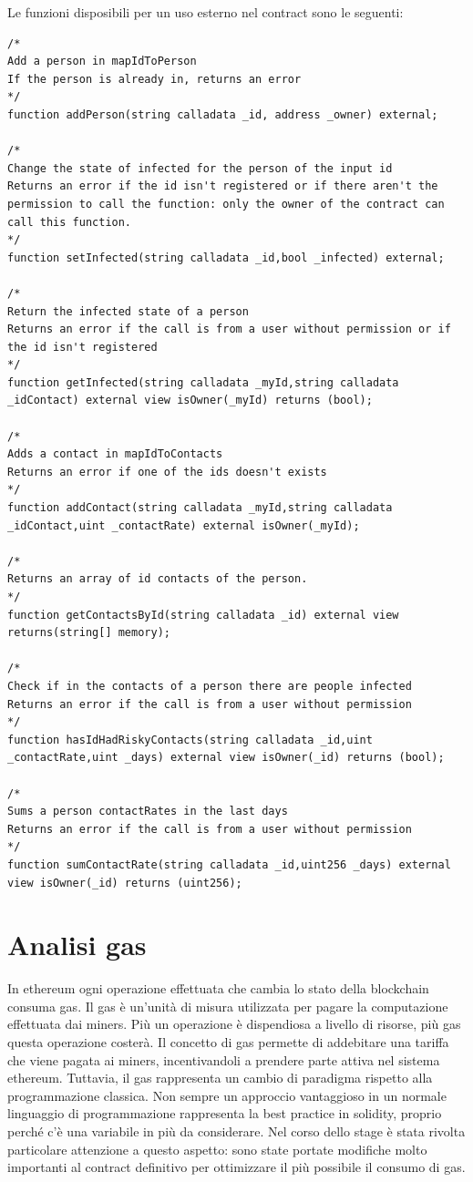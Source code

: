 Le funzioni disposibili per un uso esterno nel contract sono le seguenti:
\begin{lstlisting}[language=Solidity]
/*
Add a person in mapIdToPerson
If the person is already in, returns an error
*/
function addPerson(string calladata _id, address _owner) external;

/*
Change the state of infected for the person of the input id
Returns an error if the id isn't registered or if there aren't the permission to call the function: only the owner of the contract can call this function.
*/    
function setInfected(string calladata _id,bool _infected) external;

/*
Return the infected state of a person
Returns an error if the call is from a user without permission or if the id isn't registered
*/
function getInfected(string calladata _myId,string calladata _idContact) external view isOwner(_myId) returns (bool);

/*
Adds a contact in mapIdToContacts
Returns an error if one of the ids doesn't exists
*/    
function addContact(string calladata _myId,string calladata _idContact,uint _contactRate) external isOwner(_myId);

/*
Returns an array of id contacts of the person.
*/    
function getContactsById(string calladata _id) external view returns(string[] memory);

/*
Check if in the contacts of a person there are people infected
Returns an error if the call is from a user without permission
*/    
function hasIdHadRiskyContacts(string calladata _id,uint _contactRate,uint _days) external view isOwner(_id) returns (bool);

/*
Sums a person contactRates in the last days
Returns an error if the call is from a user without permission
*/   
function sumContactRate(string calladata _id,uint256 _days) external view isOwner(_id) returns (uint256);
\end{lstlisting}

\section{Analisi gas}
In ethereum ogni operazione effettuata che cambia lo stato della blockchain consuma gas. Il gas è un’unità di misura utilizzata per pagare la computazione effettuata dai miners. Più un operazione è dispendiosa a livello di risorse, più gas questa operazione costerà.
Il concetto di gas permette di addebitare una tariffa che viene pagata ai miners, incentivandoli a prendere parte attiva nel sistema ethereum.
Tuttavia, il gas rappresenta un cambio di paradigma rispetto alla programmazione classica. Non sempre un approccio vantaggioso in un normale linguaggio di programmazione rappresenta la best practice in solidity, proprio perché c’è una variabile in più da considerare. 
Nel corso dello stage è stata rivolta particolare attenzione a questo aspetto: sono state portate modifiche molto importanti al contract definitivo per ottimizzare il più possibile il consumo di gas.\\

